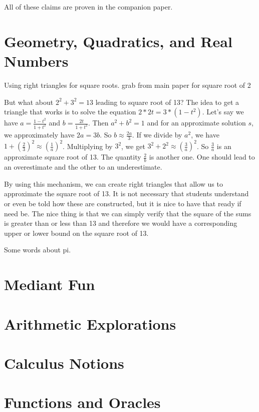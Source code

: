 \documentclass[12pt]{article}
\begin{document}
All of these claims are proven in the companion paper. 



\section{Geometry, Quadratics, and Real Numbers}

Using right triangles for square roots. grab from main paper for square root of 2

But what about $2^2 + 3^2 = 13$ leading to square root of 13?  The idea to get a triangle that works is to solve the equation $2 * 2t = 3 * (1-t^2)$. Let's say we have $a=\frac{1-t^2}{1+t^2}$ and $b = \frac{2t}{1+t^2}$.  Then $a^2 + b^2 = 1$ and for an approximate solution $s$, we approximately have $2a = 3b$. So $b \approx \frac{2a}{3}$. If we divide by $a^2$, we have $1 + (\frac{2}{3})^2 \approx (\frac{1}{a})^2$. Multiplying by $3^2$, we get $3^2 + 2^2 \approx (\frac{3}{a})^2$. So $\frac{3}{a}$ is an approximate square root of 13. The quantity $\frac{2}{b}$ is another one. One should lead to an overestimate and the other to an underestimate. 

By using this mechanism, we can create right triangles that allow us to approximate the square root of 13. It is not necessary that students understand or even be told how these are constructed, but it is nice to have that ready if need be. The nice thing is that we can simply verify that the square of the sums is greater than or less than 13 and therefore we would have a corresponding upper or lower bound on the square root of 13.


Some words about pi. 

\section{Mediant Fun}

\section{Arithmetic Explorations}

\section{Calculus Notions}

\section{Functions and Oracles}
\end{document}
